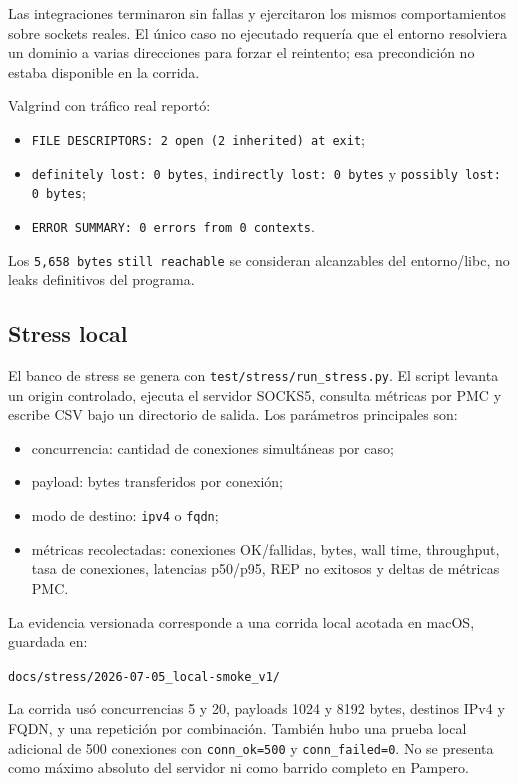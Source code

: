 Las integraciones terminaron sin fallas y ejercitaron los mismos comportamientos
sobre sockets reales. El único caso no ejecutado requería que el entorno
resolviera un dominio a varias direcciones para forzar el reintento; esa
precondición no estaba disponible en la corrida.

Valgrind con tráfico real reportó:
\begin{itemize}[nosep]
  \item \texttt{FILE DESCRIPTORS: 2 open (2 inherited) at exit};
  \item \texttt{definitely lost: 0 bytes}, \texttt{indirectly lost: 0 bytes} y
  \texttt{possibly lost: 0 bytes};
  \item \texttt{ERROR SUMMARY: 0 errors from 0 contexts}.
\end{itemize}
Los \texttt{5,658 bytes} \texttt{still reachable} se consideran alcanzables del
entorno/libc, no leaks definitivos del programa.

\subsection{Stress local}

El banco de stress se genera con \texttt{test/stress/run\_stress.py}. El script
levanta un origin controlado, ejecuta el servidor SOCKS5, consulta métricas por
PMC y escribe CSV bajo un directorio de salida. Los parámetros principales son:

\begin{itemize}[nosep]
  \item concurrencia: cantidad de conexiones simultáneas por caso;
  \item payload: bytes transferidos por conexión;
  \item modo de destino: \texttt{ipv4} o \texttt{fqdn};
  \item métricas recolectadas: conexiones OK/fallidas, bytes, wall time,
  throughput, tasa de conexiones, latencias p50/p95, REP no exitosos y deltas
  de métricas PMC.
\end{itemize}

La evidencia versionada corresponde a una corrida local acotada en macOS,
guardada en:
\begin{center}
\texttt{docs/stress/2026-07-05\_local-smoke\_v1/}
\end{center}

La corrida usó concurrencias 5 y 20, payloads 1024 y 8192 bytes, destinos IPv4 y
FQDN, y una repetición por combinación. También hubo una prueba local adicional de
500 conexiones con \texttt{conn\_ok=500} y \texttt{conn\_failed=0}. No se
presenta como máximo absoluto del servidor ni como barrido completo en Pampero.

